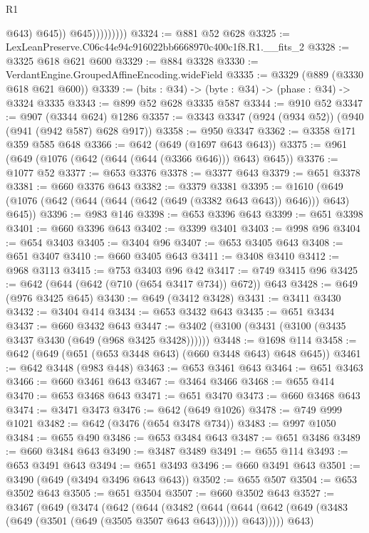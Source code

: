\begin{lexlean}{R1}
\begin{coremodule}
                            @643)
                          @645))
                      @645)))))))))
@3324 := @881 @52 @628
@3325 := LexLeanPreserve.C06c44e94c916022bb6668970c400c1f8.R1.__fits_2
@3328 := @3325 @618 @621 @600
@3329 := @884 @3328
@3330 := VerdantEngine.GroupedAffineEncoding.wideField
@3335 := @3329 (@889 (@3330 @618 @621 @600))
@3339 := (bits : @34) -> (byte : @34) -> (phase : @34) -> @3324 @3335
@3343 := @899 @52 @628 @3335 @587
@3344 := @910 @52
@3347 := @907 (@3344 @624) @1286
@3357 := @3343 @3347 (@924 (@934 @52)) (@940 (@941 (@942 @587) @628 @917))
@3358 := @950 @3347
@3362 := @3358 @171 @359 @585 @648
@3366 := @642 (@649 (@1697 @643 @643))
@3375 := @961 (@649 (@1076 (@642 (@644 (@644 (@3366 @646))) @643) @645))
@3376 := @1077 @52
@3377 := @653 @3376
@3378 := @3377 @643
@3379 := @651 @3378
@3381 := @660 @3376 @643
@3382 := @3379 @3381
@3395 := @1610 (@649 (@1076 (@642 (@644 (@644 (@642 (@649 (@3382 @643 @643)) @646))) @643) @645))
@3396 := @983 @146
@3398 := @653 @3396 @643
@3399 := @651 @3398
@3401 := @660 @3396 @643
@3402 := @3399 @3401
@3403 := @998 @96
@3404 := @654 @3403
@3405 := @3404 @96
@3407 := @653 @3405 @643
@3408 := @651 @3407
@3410 := @660 @3405 @643
@3411 := @3408 @3410
@3412 := @968 @3113
@3415 := @753 @3403 @96 @42
@3417 := @749 @3415 @96
@3425 := @642 (@644 (@642 (@710 (@654 @3417 @734)) @672)) @643
@3428 := @649 (@976 @3425 @645)
@3430 := @649 (@3412 @3428)
@3431 := @3411 @3430
@3432 := @3404 @414
@3434 := @653 @3432 @643
@3435 := @651 @3434
@3437 := @660 @3432 @643
@3447 := @3402 (@3100 (@3431 (@3100 (@3435 @3437 @3430 (@649 (@968 @3425 @3428))))))
@3448 := @1698 @114
@3458 := @642 (@649 (@651 (@653 @3448 @643) (@660 @3448 @643) @648 @645))
@3461 := @642 @3448 (@983 @448)
@3463 := @653 @3461 @643
@3464 := @651 @3463
@3466 := @660 @3461 @643
@3467 := @3464 @3466
@3468 := @655 @414
@3470 := @653 @3468 @643
@3471 := @651 @3470
@3473 := @660 @3468 @643
@3474 := @3471 @3473
@3476 := @642 (@649 @1026)
@3478 := @749 @999 @1021
@3482 := @642 (@3476 (@654 @3478 @734))
@3483 := @997 @1050
@3484 := @655 @490
@3486 := @653 @3484 @643
@3487 := @651 @3486
@3489 := @660 @3484 @643
@3490 := @3487 @3489
@3491 := @655 @114
@3493 := @653 @3491 @643
@3494 := @651 @3493
@3496 := @660 @3491 @643
@3501 := @3490 (@649 (@3494 @3496 @643 @643))
@3502 := @655 @507
@3504 := @653 @3502 @643
@3505 := @651 @3504
@3507 := @660 @3502 @643
@3527 := @3467
    (@649
      (@3474
        (@642
          (@644
            (@3482
              (@644
                (@644 (@642 (@649 (@3483 (@649 (@3501 (@649 (@3505 @3507 @643 @643)))))) @643)))))
          @643)

\end{coremodule}
\end{lexlean}
